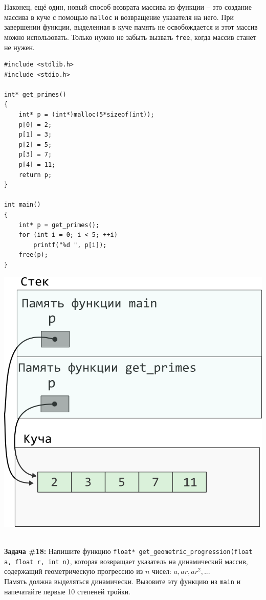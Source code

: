 \documentclass{article}
\begin{document}
Наконец, ещё один, новый способ возврата массива из функции -- это создание
массива в куче с помощью \texttt{malloc} и возвращение указателя на него.
При завершении функции, выделенная в куче память не освобождается и этот массив
можно использовать. Только нужно не забыть вызвать \texttt{free}, когда 
массив станет не нужен.
\begin{multicols}{2}
\begin{lstlisting}
#include <stdlib.h>
#include <stdio.h>

int* get_primes()
{
	int* p = (int*)malloc(5*sizeof(int));
	p[0] = 2;
	p[1] = 3;
	p[2] = 5;
	p[3] = 7;
	p[4] = 11;
	return p;
}

int main()
{
	int* p = get_primes();
	for (int i = 0; i < 5; ++i)
		printf("%d ", p[i]);
	free(p);
}
\end{lstlisting}
\columnbreak
\begin{center}
\includegraphics[scale=1]{../../images/pointer_schemes/function_return_heap_array.png}
\end{center}
\end{multicols}
\quad\\
\textbf{Задача \#18:} Напишите функцию \texttt{float* get\_geometric\_progression(float a, float r, int n)}, которая возвращает указатель на динамический массив, содержащий геометрическую прогрессию из $n$ чисел: 
$a, ar, ar^2, ...$\\
Память должна выделяться динамически. Вызовите эту функцию из \texttt{main} и напечатайте первые 10 степеней тройки.
\end{document}
